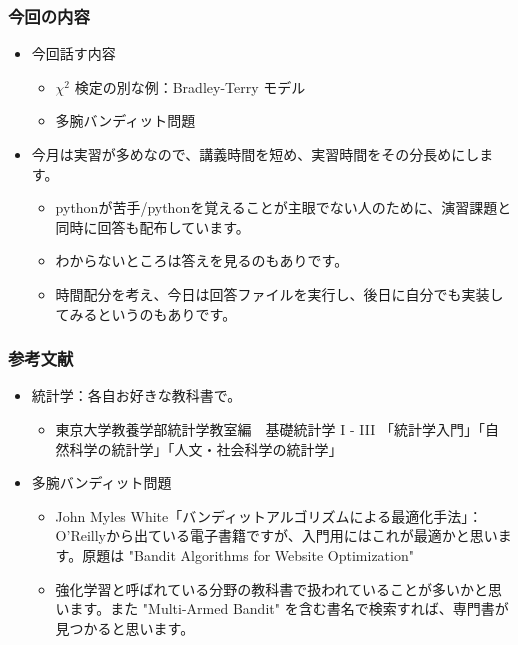 \documentclass{beamer}
\begin{document}
\begin{frame}
  \frametitle{今回の内容}
  \begin{itemize}
  \item 今回話す内容
  \begin{itemize}
    \item $\chi^2$ 検定の別な例：Bradley-Terry モデル
    \item 多腕バンディット問題
  \end{itemize}
  \item 今月は実習が多めなので、講義時間を短め、実習時間をその分長めにします。
  \begin{itemize}
    \item pythonが苦手/pythonを覚えることが主眼でない人のために、演習課題と同時に回答も配布しています。
    \item わからないところは答えを見るのもありです。
    \item 時間配分を考え、今日は回答ファイルを実行し、後日に自分でも実装してみるというのもありです。
  \end{itemize}
  \end{itemize}  
\end{frame}
\begin{frame}
  \frametitle{参考文献}
  \begin{itemize}
    \item 統計学：各自お好きな教科書で。
    \begin{itemize} 
      \item 東京大学教養学部統計学教室編　基礎統計学 I - III 「統計学入門」「自然科学の統計学」「人文・社会科学の統計学」
    \end{itemize}  
    \item 多腕バンディット問題
    \begin{itemize}
      \item John Myles White「バンディットアルゴリズムによる最適化手法」：O'Reillyから出ている電子書籍ですが、入門用にはこれが最適かと思います。原題は "Bandit Algorithms for Website Optimization"
      \item 強化学習と呼ばれている分野の教科書で扱われていることが多いかと思います。また "Multi-Armed Bandit" を含む書名で検索すれば、専門書が見つかると思います。
    \end{itemize}
  \end{itemize}
\end{frame}
\end{document}

